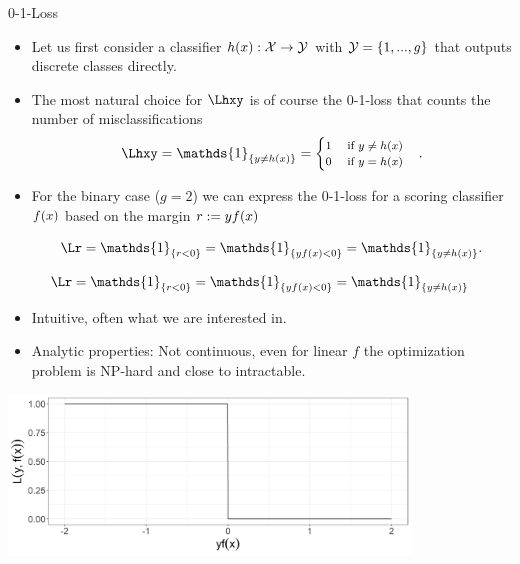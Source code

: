 \begin{vbframe}{0-1-Loss}

\begin{itemize}
  \item Let us first consider a classifier $h(x): \mathcal{X} \to \mathcal{Y}$ with $\mathcal{Y} = \{1, ..., g\}$ that outputs discrete classes directly. 
  \item The most natural choice for $\Lhxy$ is of course the 0-1-loss that counts the number of misclassifications
  $$
  \Lhxy = \mathds{1}_{\{y \ne \hx\}} =
     \footnotesize \begin{cases} 1 \quad \text{ if } y \ne \hx \\ 0 \quad    \text{ if } y = \hx  \end{cases}.
  $$
  \item For the binary case ($g = 2$) we can express the 0-1-loss for a scoring classifier $f(x)$ based on the margin $r := yf(x)$

  $$
  \Lr = \mathds{1}_{\{r < 0\}} = \mathds{1}_{\{y\fx < 0\}} = \mathds{1}_{\{y \neq \hx\}}.
  $$

\end{itemize}


\framebreak 

$$
  \Lr = \mathds{1}_{\{r < 0\}} = \mathds{1}_{\{y\fx < 0\}} = \mathds{1}_{\{y \neq \hx\}} 
$$

\begin{itemize}
\item Intuitive, often what we are interested in.
\item Analytic properties:  Not continuous, even for linear $f$ the optimization problem is NP-hard and close to intractable.
\end{itemize}

\vfill

\begin{center}
\includegraphics[width = 0.8\textwidth]{figure/plot_loss_01.png}
\end{center}


\end{vbframe}


